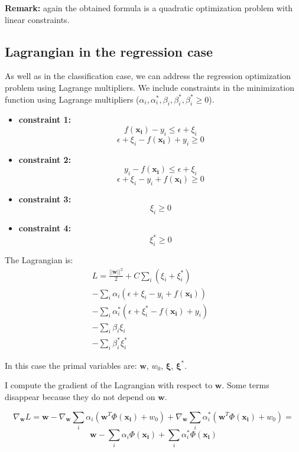 \textbf{Remark:} again the obtained formula is a quadratic optimization problem
with linear constraints.

\subsection{Lagrangian in the regression case}
As well as in the classification case, we can address the regression optimization
problem using Lagrange multipliers. We include constraints in the minimization
function using Lagrange multipliers ($\alpha_{i}, \alpha_{i}^{*}, \beta_{i}, \beta
_{i}^{*}, \beta_{i}^{*}\geq 0$).

\begin{itemize}
	\item \textbf{constraint 1:}
		\[
			f(\pmb{x_i})-y_{i}\leq \epsilon + \xi_{i}
		\]
		\[
			\epsilon + \xi_{i}-f(\pmb{x_i})+y_{i}\geq 0
		\]

	\item \textbf{constraint 2:}
		\[
			y_{i}- f(\pmb{x_i}) \leq \epsilon + \xi_{i}
		\]
		\[
			\epsilon + \xi_{i}-y_{i}+ f(\pmb{x_i}) \geq 0
		\]

	\item \textbf{constraint 3:}
		\[
			\xi_{i}\geq 0
		\]

	\item \textbf{constraint 4:}
		\[
			\xi_{i}^{*}\geq 0
		\]
\end{itemize}

The Lagrangian is:
\begin{align*}
	L = \frac{||\pmb{w}||^{2}}{2}+ C \sum_{i}(\xi_{i}+ \xi_{i}^{*})      &  \\
	- \sum_{i}\alpha_{i}(\epsilon + \xi_{i}- y_{i}+ f(\pmb{x_i}))        &  \\
	- \sum_{i}\alpha_{i}^{*}(\epsilon + \xi_{i}^{*}- f(\pmb{x_i})+y_{i}) &  \\
	- \sum_{i}\beta_{i}\xi_{i}                                           &  \\
	- \sum_{i}\beta_{i}^{*}\xi_{i}^{*}
\end{align*}

In this case the primal variables are: $\pmb{w}$, $w_{0}$, $\pmb{\xi}$, $\pmb{\xi}
^{*}$.

I compute the gradient of the Lagrangian with respect to $\pmb{w}$. Some terms
disappear because they do not depend on $\pmb{w}$.

\[
	\nabla_{\pmb{w}}L = \pmb{w}- \nabla_{\pmb{w}}\sum_{i}\alpha_{i}(\pmb{w}^{T}\Phi
	(\pmb{x_i}) + w_{0}) + \nabla_{\pmb{w}}\sum_{i}\alpha_{i}^{*}(\pmb{w}^{T}\Phi (
	\pmb{x_i}) + w_{0}) =
\]
\[
	\pmb{w}- \sum_{i}\alpha_{i}\Phi(\pmb{x_i}) + \sum_{i}\alpha_{i}^{*}\Phi(\pmb{x_i}
	)
\]

